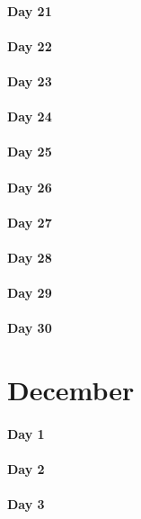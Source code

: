 \documentclass[UTF8,a4paper,8pt]{ctexart}
\begin{document}
 	 \paragraph{Day 21      \quad     }
 	 \paragraph{Day 22      \quad     }
 	 \paragraph{Day 23      \quad     }
 	 \paragraph{Day 24      \quad     }
 	 \paragraph{Day 25      \quad     }
 	 \paragraph{Day 26      \quad     }
 	 \paragraph{Day 27      \quad     }
 	 \paragraph{Day 28      \quad     }
 	 \paragraph{Day 29      \quad     }   
 	 \paragraph{Day 30      \quad     }
\section{December}
 	 \paragraph{Day 1       \quad     }
 	 \paragraph{Day 2       \quad     }
 	 \paragraph{Day 3       \quad     }
\end{document}
